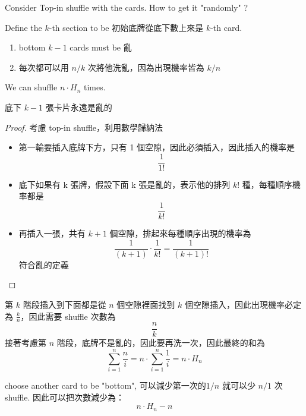 \begin{exercise}
    Consider Top-in shuffle with the cards. How to get it "randomly" ?
\end{exercise}
\begin{answer}
    Define the $k$-th section to be 初始底牌從底下數上來是 $k$-th card.

    \begin{enumerate}
        \item bottom $k-1$ cards must be 亂
        \item 每次都可以用 $n/k$ 次將他洗亂，因為出現機率皆為 $k/n$
    \end{enumerate}

    We can shuffle $n \cdot H_n$ times.
\end{answer}

\begin{theorem}
    底下 $k-1$ 張卡片永遠是亂的
\end{theorem}
\begin{proof}
    考慮 top-in shuffle，利用數學歸納法
    \begin{itemize}
        \item 第一輪要插入底牌下方，只有 1 個空隙，因此必須插入，因此插入的機率是 \[
        \frac{1}{1!}
        \]
        \item 底下如果有 k 張牌，假設下面 k 張是亂的，表示他的排列 $k!$ 種，每種順序機率都是 \[
        \frac{1}{k!}
        \]
        \item 再插入一張，共有 $k+1$ 個空隙，排起來每種順序出現的機率為 \[
        \frac{1}{(k+1)} \cdot \frac{1}{k!} = \frac{1}{(k+1)!}
        \]
        符合亂的定義
    \end{itemize}
\end{proof}

第 $k$ 階段插入到下面都是從 $n$ 個空隙裡面找到 $k$ 個空隙插入，因此出現機率必定為 \(\frac{k}{n}\)，因此需要 shuffle 次數為\[
\frac{n}{k}
\]
接著考慮第 $n$ 階段，底牌不是亂的，因此要再洗一次，因此最終的和為\[
\sum_{i=1}^{n} \frac{n}{i} = n \cdot \sum_{i=1}^{n}\frac{1}{i} = n\cdot H_n
\]

\begin{note}
    choose another card to be "bottom", 可以減少第一次的$1/n$ 就可以少 $n/1$ 次 shuffle. 因此可以把次數減少為：
    \[
        n\cdot H_n - n
    \]
\end{note}

\begin{remark}
\end{remark}


